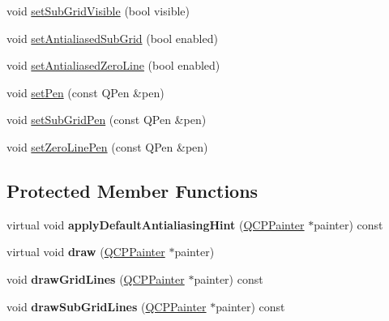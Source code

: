 \begin{DoxyCompactItemize}
\item 
void \hyperlink{class_q_c_p_grid_ad4ad6bf714ec45e08845456355a1b700}{set\+Sub\+Grid\+Visible} (bool visible)
\item 
void \hyperlink{class_q_c_p_grid_a5692310ba183721a413d60951407d114}{set\+Antialiased\+Sub\+Grid} (bool enabled)
\item 
void \hyperlink{class_q_c_p_grid_a3cc6d54647393ee71afb6da56af07aa4}{set\+Antialiased\+Zero\+Line} (bool enabled)
\item 
void \hyperlink{class_q_c_p_grid_aa05ab9816ffb440908171e45e833b593}{set\+Pen} (const Q\+Pen \&pen)
\item 
void \hyperlink{class_q_c_p_grid_a9edd3593f384d1f0b0202a39cef4453d}{set\+Sub\+Grid\+Pen} (const Q\+Pen \&pen)
\item 
void \hyperlink{class_q_c_p_grid_a209f40fdb252397b418b82d3494d8ea0}{set\+Zero\+Line\+Pen} (const Q\+Pen \&pen)
\end{DoxyCompactItemize}
\subsection*{Protected Member Functions}
\begin{DoxyCompactItemize}
\item 
virtual void {\bfseries apply\+Default\+Antialiasing\+Hint} (\hyperlink{class_q_c_p_painter}{Q\+C\+P\+Painter} $\ast$painter) const \hypertarget{class_q_c_p_grid_a9916f5e38b4d6cae446537aeb47c7272}{}\label{class_q_c_p_grid_a9916f5e38b4d6cae446537aeb47c7272}

\item 
virtual void {\bfseries draw} (\hyperlink{class_q_c_p_painter}{Q\+C\+P\+Painter} $\ast$painter)\hypertarget{class_q_c_p_grid_ad009c23f96078616aa4f66a750974b23}{}\label{class_q_c_p_grid_ad009c23f96078616aa4f66a750974b23}

\item 
void {\bfseries draw\+Grid\+Lines} (\hyperlink{class_q_c_p_painter}{Q\+C\+P\+Painter} $\ast$painter) const \hypertarget{class_q_c_p_grid_a3aff10e993f6625e255c19e4f97a09d8}{}\label{class_q_c_p_grid_a3aff10e993f6625e255c19e4f97a09d8}

\item 
void {\bfseries draw\+Sub\+Grid\+Lines} (\hyperlink{class_q_c_p_painter}{Q\+C\+P\+Painter} $\ast$painter) const \hypertarget{class_q_c_p_grid_afa5d9d12de419e881f381f2ab7cb414d}{}\label{class_q_c_p_grid_afa5d9d12de419e881f381f2ab7cb414d}

\end{DoxyCompactItemize}
